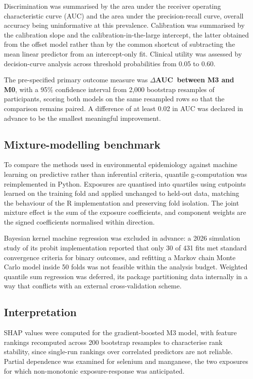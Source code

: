 \documentclass[12pt]{article}
\newcommand{\deltaauc}{$\Delta$AUC}
\begin{document}
Discrimination was summarised by the area under the receiver operating characteristic curve (AUC) and the area under the precision-recall curve, overall accuracy being uninformative at this prevalence. Calibration was summarised by the calibration slope and the calibration-in-the-large intercept, the latter obtained from the offset model rather than by the common shortcut of subtracting the mean linear predictor from an intercept-only fit. Clinical utility was assessed by decision-curve analysis across threshold probabilities from 0.05 to 0.60.

The pre-specified primary outcome measure was \textbf{\deltaauc\ between M3 and M0}, with a 95\% confidence interval from 2,000 bootstrap resamples of participants, scoring both models on the same resampled rows so that the comparison remains paired. A difference of at least 0.02 in AUC was declared in advance to be the smallest meaningful improvement.

\subsection*{Mixture-modelling benchmark}

To compare the methods used in environmental epidemiology against machine learning on predictive rather than inferential criteria, quantile g-computation was reimplemented in Python. Exposures are quantised into quartiles using cutpoints learned on the training fold and applied unchanged to held-out data, matching the behaviour of the R implementation and preserving fold isolation. The joint mixture effect is the sum of the exposure coefficients, and component weights are the signed coefficients normalised within direction.

Bayesian kernel machine regression was excluded in advance: a 2026 simulation study of its probit implementation reported that only 30 of 431 fits met standard convergence criteria for binary outcomes, and refitting a Markov chain Monte Carlo model inside 50 folds was not feasible within the analysis budget. Weighted quantile sum regression was deferred, its package partitioning data internally in a way that conflicts with an external cross-validation scheme.

\subsection*{Interpretation}

SHAP values were computed for the gradient-boosted M3 model, with feature rankings recomputed across 200 bootstrap resamples to characterise rank stability, since single-run rankings over correlated predictors are not reliable. Partial dependence was examined for selenium and manganese, the two exposures for which non-monotonic exposure-response was anticipated.
\end{document}
